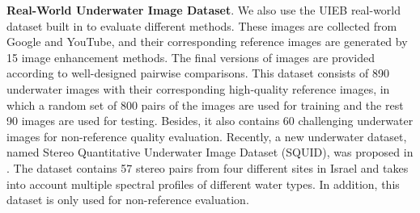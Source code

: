 \documentclass[journal]{IEEEtran}
\begin{document}
\textbf{Real-World Underwater Image Dataset}. We also use the UIEB
real-world dataset built in \cite{water-net} to evaluate different methods. These images are collected from Google and YouTube, and their corresponding reference images are generated by 15 image enhancement methods. The final versions of images are provided according to
well-designed pairwise comparisons. This dataset consists of 890 underwater images with their corresponding high-quality reference images, in which a random set of 800 pairs of the images are used for training and the rest 90 images are used for testing. Besides, it also contains 60 challenging underwater images for non-reference quality evaluation. Recently, a new underwater dataset, named Stereo Quantitative Underwater Image Dataset (SQUID), was proposed in \cite{berman2020underwater}. The dataset contains 57 stereo pairs from four different sites in Israel and takes into account multiple spectral profiles of different water types. In addition, this dataset is only used for non-reference evaluation.
\end{document}
